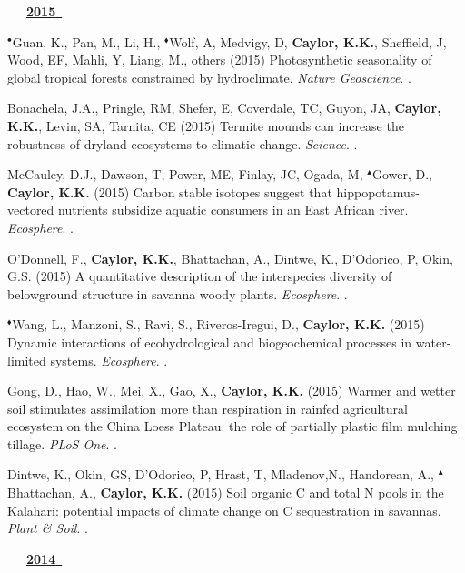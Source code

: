 \begin{etaremune}
\vspace{0.1in}
\mbox{\ \ \ \underline{\textbf{2015 }}}
\vspace{0.1in}

\item $^{\bullet}$Guan, K., Pan, M., Li, H., $^{\blacklozenge}$Wolf, A, Medvigy, D, \textbf{ Caylor, K.K.}, Sheffield, J, Wood, EF, Mahli, Y, Liang, M., others (2015) Photosynthetic seasonality of global tropical forests constrained by hydroclimate. \emph{Nature Geoscience}. .
\item Bonachela, J.A., Pringle, RM, Shefer, E, Coverdale, TC, Guyon, JA, \textbf{ Caylor, K.K.}, Levin, SA, Tarnita, CE (2015) Termite mounds can increase the robustness of dryland ecosystems to climatic change. \emph{Science}. .
\item McCauley, D.J., Dawson, T, Power, ME, Finlay, JC, Ogada, M, $^{\blacktriangle}$Gower, D., \textbf{ Caylor, K.K.} (2015) Carbon stable isotopes suggest that hippopotamus-vectored nutrients subsidize aquatic consumers in an East African river. \emph{Ecosphere}. .
\item O'Donnell, F., \textbf{ Caylor, K.K.}, Bhattachan, A., Dintwe, K., D'Odorico, P, Okin, G.S. (2015) A quantitative description of the interspecies diversity of belowground structure in savanna woody plants. \emph{Ecosphere}. .
\item $^{\blacklozenge}$Wang, L., Manzoni, S., Ravi, S., Riveros-Iregui, D., \textbf{ Caylor, K.K.} (2015) Dynamic interactions of ecohydrological and biogeochemical processes in water-limited systems. \emph{Ecosphere}. .
\item Gong, D., Hao, W., Mei, X., Gao, X., \textbf{ Caylor, K.K.} (2015) Warmer and wetter soil stimulates assimilation more than respiration in rainfed agricultural ecosystem on the China Loess Plateau: the role of partially plastic film mulching tillage. \emph{PLoS One}. .
\item Dintwe, K., Okin, GS, D'Odorico, P, Hrast, T, Mladenov,N., Handorean, A., $^{\blacktriangle}$Bhattachan, A., \textbf{ Caylor, K.K.} (2015) Soil organic C and total N pools in the Kalahari: potential impacts of climate change on C sequestration in savannas. \emph{Plant \& Soil}. .

\vspace{0.1in}
\mbox{\ \ \ \underline{\textbf{2014 }}}
\vspace{0.1in}


\end{etaremune}
